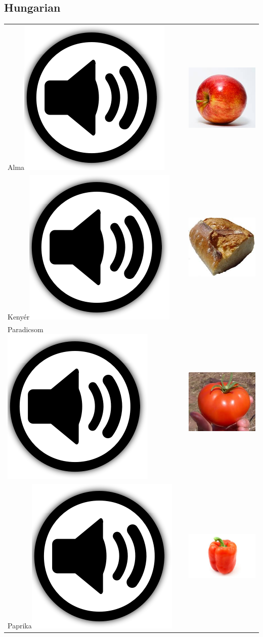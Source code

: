 \documentclass[letterpaper,twoside,openright,11pt,final]{memoir}
\newcommand{\smallimage}{100pt}
\newcommand{\audio}{{\includegraphics[scale=0.05]{audio}}}
\begin{document}
\subsection{Hungarian}
{\huge

\begin{longtabu} to \textwidth {|X|X|}
Alma\audio{} & \includegraphics[width=\smallimage]{./images/alma}\\
Kenyér\audio{} & \includegraphics[width=\smallimage]{./images/kenyer}\\
Paradicsom\audio{}& \includegraphics[width=\smallimage]{./images/paradicsom}\\
Paprika\audio{}& \includegraphics[width=\smallimage]{./images/paprika}\\

\end{longtabu}}
\end{document}
